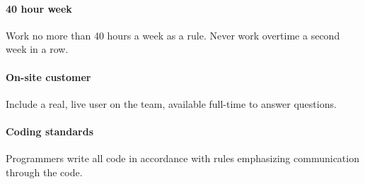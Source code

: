 \documentclass[12pt]{article}
\begin{document}
\paragraph{40 hour week} Work no more than 40 hours a week as a rule. Never work overtime a second week in a row. 

\paragraph{On-site customer} Include a real, live user on the team, available full-time to 
answer questions. 

\paragraph{Coding standards} Programmers write all code in accordance with rules 
emphasizing communication through the code. 
\end{document}
